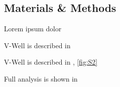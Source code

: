 \newpage



\subsection{Materials \& Methods}
\label{subapdx:materialsmethods}
Lorem ipsum dolor

\newpage




V-Well is described in 

V-Well is described in , \ref{fig:S2}


Full analysis is shown in 

